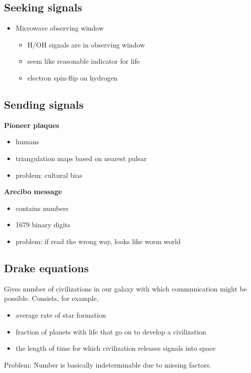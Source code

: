 \documentclass{article}
\theoremstyle{sltheorem}
\begin{document}
\subsection{Seeking signals}
\begin{itemize}
    \item Microwave observing window
    \begin{itemize}
        \item H/OH signals are in observing window
        \item seem like reasonable indicator for life
        \item electron spin-flip on hydrogen
    \end{itemize}
\end{itemize}
\subsection{Sending signals}
\textbf{Pioneer plaques}
\begin{itemize}
    \item humans
    \item triangulation maps based on nearest pulsar
    \item problem: cultural bias
\end{itemize}
\textbf{Arecibo message}
\begin{itemize}
    \item contains numbers
    \item 1679 binary digits
    \item problem: if read the wrong way, looks like worm world
\end{itemize}
\subsection{Drake equations}
Gives number of civilizations in our galaxy with which communication might be possible.
Consists, for example, 
\begin{itemize}
    \item average rate of star formation
    \item fraction of planets with life that go on to develop a civilization
    \item the length of time for which civilization releases signals into space
\end{itemize}
Problem: Number is basically indeterminable due to missing factors.
\end{document}
